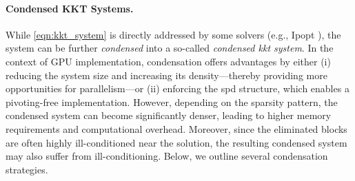 \documentclass{article}
\begin{document}
\paragraph{Condensed KKT Systems.}
While \cref{eqn:kkt_system} is directly addressed by some solvers (e.g., Ipopt \cite{wachterImplementationInteriorpointFilter2006}), the system can be further \emph{condensed} into a so-called \emph{condensed \gls*{kkt} system}. In the context of GPU implementation, condensation offers advantages by either (i) reducing the system size and increasing its density—thereby providing more opportunities for parallelism—or (ii) enforcing the \gls*{spd} structure, which enables a pivoting-free implementation. However, depending on the sparsity pattern, the condensed system can become significantly denser, leading to higher memory requirements and computational overhead. Moreover, since the eliminated blocks are often highly ill-conditioned near the solution, the resulting condensed system may also suffer from ill-conditioning. Below, we outline several condensation strategies.
\end{document}
